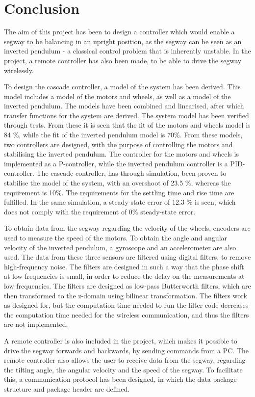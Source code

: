 \chapter{Conclusion}
The aim of this project has been to design a controller which would enable a segway to be balancing in an upright position, as the segway can be seen as an inverted pendulum - a classical control problem that is inherently unstable. In the project, a remote controller has also been made, to be able to drive the segway wirelessly. 

To design the cascade controller, a model of the system has been derived. This model includes a model of the motors and wheels, as well as a model of the inverted pendulum. The models have been combined and linearised, after which transfer functions for the system are derived. The system model has been verified through tests. From these it is seen that the fit of the motors and wheels model is 84 \%, while the fit of the inverted pendulum model is 70\%. From these models, two controllers are designed, with the purpose of controlling the motors and stabilising the inverted pendulum. The controller for the motors and wheels is implemented as a P-controller, while the inverted pendulum controller is a PID-controller. The cascade controller, has through simulation, been proven to stabilise the model of the system, with an overshoot of 23.5 \%, whereas the requirement is 10\%. The requirements for the settling time and rise time are fulfilled. 
In the same simulation, a steady-state error of 12.3 \% is seen, which does not comply with the requirement of 0\% steady-state error.

To obtain data from the segway regarding the velocity of the wheels, encoders are used to measure the speed of the motors. To obtain the angle and angular velocity of the inverted pendulum, a gyroscope and an accelerometer are also used. The data from these three sensors are filtered using digital filters, to remove high-frequency noise. The filters are designed in such a way that the phase shift at low frequencies is small, in order to reduce the delay on the measurements at low frequencies. The filters are designed as low-pass Butterworth filters, which are then transformed to the z-domain using bilinear transformation. The filters work as designed for, but the computation time needed to run the filter code decreases the computation time needed for the wireless communication, and thus the filters are not implemented.

A remote controller is also included in the project, which makes it possible to drive the segway forwards and backwards, by sending commands from a PC. The remote controller also allows the user to receive data from the segway, regarding the tilting angle, the angular velocity and the speed of the segway. To facilitate this, a communication protocol has been designed, in which the data package structure and package header are defined.

